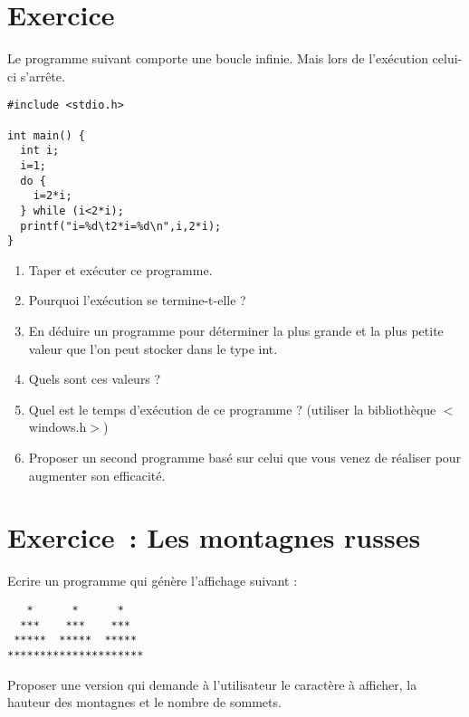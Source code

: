 \documentclass[11pt]{article}
\begin{document}
\section{Exercice}
Le programme suivant comporte une boucle infinie. Mais lors de l’exécution celui-ci s’arrête.

\begin{verbatim}
#include <stdio.h> 

int main() {
  int i; 
  i=1; 
  do {
    i=2*i;
  } while (i<2*i);
  printf("i=%d\t2*i=%d\n",i,2*i); 
}
\end{verbatim}

\begin{enumerate}
  \item Taper et exécuter ce programme. 
  \item Pourquoi l’exécution se termine-t-elle ? 
  \item En déduire un programme pour déterminer la plus grande et la plus petite valeur que l’on peut stocker dans le type int. 
  \item Quels sont ces valeurs ? 
  \item Quel est le temps d’exécution de ce programme ? (utiliser la bibliothèque $<$windows.h$>$)
  \item Proposer un second programme basé sur celui que vous venez de réaliser pour augmenter son efficacité.
\end{enumerate}


\section{Exercice~: Les montagnes russes}
Ecrire un programme qui génère l’affichage suivant :
\begin{verbatim}
   *      *      *
  ***    ***    ***
 *****  *****  *****
*********************
\end{verbatim}
Proposer une version qui demande à l’utilisateur le caractère à afficher, la hauteur des montagnes et le nombre de sommets.
\end{document}
